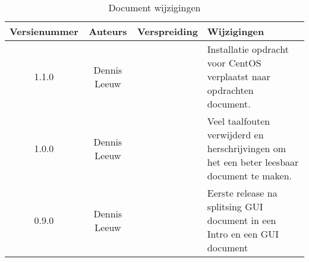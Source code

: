 \begin{flushleft}
\begin{table}[h!]
\centering
\begin{tabularx}{\textwidth}{ |c|c|c|X| }
\hline
	Versienummer &
	Auteurs &
	Verspreiding &
	Wijzigingen\\
\hline
	1.1.0 &
	Dennis Leeuw &
	&
	Installatie opdracht voor CentOS verplaatst naar opdrachten document.\\
\hline
	1.0.0 &
	Dennis Leeuw &
	&
	Veel taalfouten verwijderd en herschrijvingen om het een beter leesbaar document te maken.\\
\hline
	0.9.0 &
	Dennis Leeuw &
	&
	Eerste release na splitsing GUI document in een Intro en een GUI document\\
\hline
\end{tabularx}
\caption{Document wijzigingen}
\label{table:1}
\end{table}
\end{flushleft}


